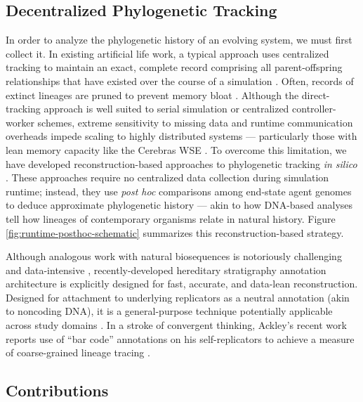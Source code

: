\subsection{Decentralized Phylogenetic Tracking}

In order to analyze the phylogenetic history of an evolving system, we must first collect it.
In existing artificial life work, a typical approach uses centralized tracking to maintain an exact, complete record comprising all parent-offspring relationships that have existed over the course of a simulation \citep{ray1992evolution,bohm2017mabe,de2012deap,garwood2019revosim,godin2019apoget,dolson2024phylotrackpy}.
Often, records of extinct lineages are pruned to prevent memory bloat \citep{moreno2024analysis}.
Although the direct-tracking approach is well suited to serial simulation or centralized controller-worker schemes, extreme sensitivity to missing data and runtime communication overheads impede scaling to highly distributed systems --- particularly those with lean memory capacity like the Cerebras WSE \citep{moreno2024analysis}.
To overcome this limitation, we have developed reconstruction-based approaches to phylogenetic tracking \textit{in silico} \citep{moreno2022hereditary}.
These approaches require no centralized data collection during simulation runtime; instead, they use \textit{post hoc} comparisons among end-state agent genomes to deduce approximate phylogenetic history --- akin to how DNA-based analyses tell how lineages of contemporary organisms relate in natural history.
Figure \ref{fig:runtime-posthoc-schematic} summarizes this reconstruction-based strategy.

Although analogous work with natural biosequences is notoriously challenging and data-intensive \citep{neyman1971molecular,lemmon2013high},
recently-developed hereditary stratigraphy annotation architecture is explicitly designed for fast, accurate, and data-lean reconstruction.
Designed for attachment to underlying replicators as a neutral annotation (akin to noncoding DNA), it is a general-purpose technique potentially applicable across study domains \citep{liben2008tracing,cohen1987computer,friggeri2014rumor}.
In a stroke of convergent thinking, Ackley's recent work reports use of ``bar code'' annotations on his self-replicators to achieve a measure of coarse-grained lineage tracing \citep{ackley2023robust}.

\subsection{Contributions}

